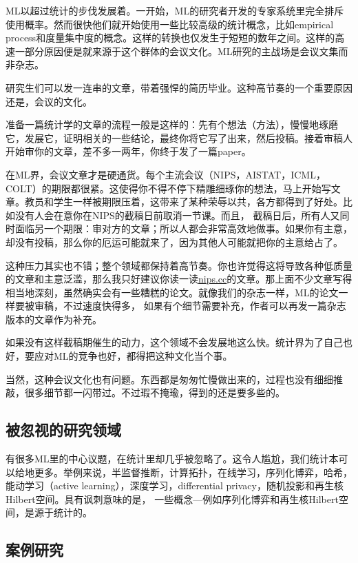 \documentclass[]{article}
\begin{document}
ML以超过统计的步伐发展着。一开始，ML的研究者开发的专家系统里完全排斥使用概率。然而很快他们就开始使用一些比较高级的统计概念，比如empirical process和度量集中度的概念。这样的转换也仅发生于短短的数年之间。这样的高速一部分原因便是就来源于这个群体的会议文化。ML研究的主战场是会议文集而非杂志。

研究生们可以发一连串的文章，带着强悍的简历毕业。这种高节奏的一个重要原因还是，会议的文化。 

准备一篇统计学的文章的流程一般是这样的：先有个想法（方法），慢慢地琢磨它，发展它，证明相关的一些结论，最终你将它写了出来，然后投稿。接着审稿人开始审你的文章，差不多一两年，你终于发了一篇paper。

在ML界，会议文章才是硬通货。每个主流会议（NIPS，AISTAT，ICML，COLT）的期限都很紧。这使得你不得不停下精雕细琢你的想法，马上开始写文章。教员和学生一样被期限压着，这带来了某种荣辱以共，各方都得到了好处。比如没有人会在意你在NIPS的截稿日前取消一节课。而且，
截稿日后，所有人又同时面临另一个期限：审对方的文章；所以人都会非常高效地做事。如果你有主意，却没有投稿，那么你的厄运可能就来了，因为其他人可能就把你的主意给占了。

这种压力其实也不错；整个领域都保持着高节奏。你也许觉得这将导致各种低质量的文章和主意泛滥，那么我只好建议你读一读\url{nips.cc}的文章。那上面不少文章写得相当地深刻，虽然确实会有一些糟糕的论文。就像我们的杂志一样，ML的论文一样要被审稿，不过速度快得多，
如果有个细节需要补充，作者可以再发一篇杂志版本的文章作为补充。

如果没有这样截稿期催生的动力，这个领域不会发展地这么快。统计界为了自己也好，要应对ML的竞争也好，都得把这种文化当个事。

当然，这种会议文化也有问题。东西都是匆匆忙慢做出来的，过程也没有细细推敲，很多细节都一闪带过。不过瑕不掩瑜，得到的还是要多些的。

\subsection{被忽视的研究领域}

有很多ML里的中心议题，在统计里却几乎被忽略了。这令人尴尬，我们统计本可以给地更多。举例来说，半监督推断，计算拓扑，在线学习，序列化博弈，哈希，能动学习（active learning），深度学习，differential privacy，随机投影和再生核Hilbert空间。具有讽刺意味的是，
一些概念---例如序列化博弈和再生核Hilbert空间，是源于统计的。

\subsection{案例研究}
\end{document}
